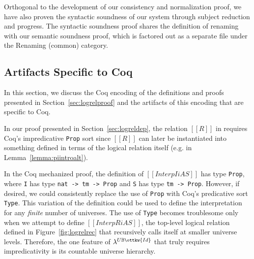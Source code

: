 \documentclass[acmsmall,screen=true,
\ifpublic review=false\else,review=true\fi
  ,anonymous=\ifanonymous true\else false\fi]{acmart}
\newcommand{\lang}{$\lambda^{U\mathbb{B}\ottkw{Id}}$\xspace}
\newcommand{\scw}[1]{}
\newcommand{\yl}[1]{}
\begin{document}
Orthogonal to the development of our consistency and normalization
proof, we have also proven the syntactic soundness of our system through subject
reduction and progress. The syntactic soundness proof shares the
definition of renaming with our semantic soundness proof, which is
factored out as a separate file under the Renaming (common) category.
\scw{Should add this line count as another column, for comparison. I've done so,
but may need to update the numbers. }

\subsection{Artifacts Specific to Coq}
In this section, we discuss the Coq encoding of the definitions and proofs presented
in Section~\ref{sec:logrelproof} and the artifacts of this encoding that are
specific to Coq.


In our proof presented in Section~\ref{sec:logreldep}, the relation
$[[R]]$ in  requires Coq's impredicative \texttt{Prop} sort
since $[[R]]$ can later be instantiated into something defined in
terms of the logical relation itself (e.g. in
Lemma~\ref{lemma:piintroalt}). \scw{I'm having trouble connecting the rule in
the figure with rule \texttt{InterpExtFun} in the coq development. Would it make
sense to include the definition of ProdSpace? What is the Coq type of R?}
\yl{I think I might just inline the definition of ProdSpace and then
  rename the variables from the Coq code to match the ones from the paper}

In the Coq mechanized proof, the definition of $[[Interp I i A S]]$ has type
\texttt{Prop}, where \texttt{I} has type \texttt{nat -> tm -> Prop} and \texttt{S}
has type \texttt {tm -> Prop}.  However, if desired, we could consistently
replace the use of \texttt{Prop} with Coq's predicative sort
\texttt{Type}. This variation of the definition could be used to define the
interpretation for any \emph{finite} number of universes. The use of
\texttt{Type} becomes troublesome only when we attempt to define
$[[InterpR i A S]]$, the top-level logical relation defined in
Figure~\ref{fig:logrelrec} that recursively calls itself at smaller universe
levels. Therefore, the one feature of \lang{} that truly requires impredicativity
is its countable universe hierarchy. \scw{I'm not sure the last part of this sentence
adds much: ``Although, lemmas such as the
admissibility of \rref{I-PiAlt} (Lemma~\ref{lemma:piintroalt}) not only simply
our mechanization, but also give better intuition on what our logical relation
means.'' Yes, we need impredicativity to define these lemmas, but without impredicativity
our logical relation means something else.}
\end{document}
